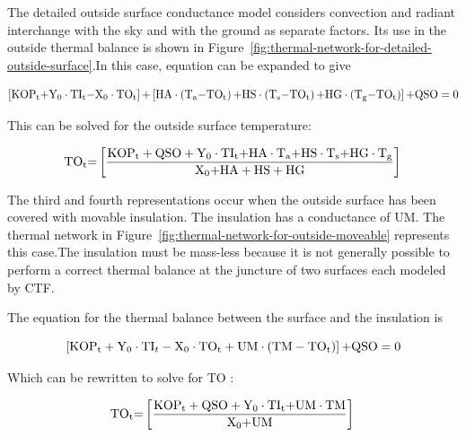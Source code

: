 The detailed outside surface conductance model considers convection and radiant interchange with the sky and with the ground as separate factors. Its use in the outside thermal balance is shown in Figure~\ref{fig:thermal-network-for-detailed-outside-surface}.In this case, equation can be expanded to give

\begin{equation}
\left[ {{\rm{KO}}{{\rm{P}}_{\rm{t}}}{\rm{ + }}{{\rm{Y}}_{\rm{0}}}\cdot {\rm{T}}{{\rm{I}}_{\rm{t}}}{\rm{ - }}{{\rm{X}}_{\rm{0}}}\cdot {\rm{T}}{{\rm{O}}_{\rm{t}}}} \right]{\rm{ + }}\left[ {{\rm{HA}}\cdot \left( {{{\rm{T}}_{\rm{a}}}{\rm{ - T}}{{\rm{O}}_{\rm{t}}}} \right){\rm{ + HS}}\cdot \left( {{{\rm{T}}_{\rm{s}}}{\rm{ - T}}{{\rm{O}}_{\rm{t}}}} \right){\rm{ + HG}}\cdot \left( {{{\rm{T}}_{\rm{g}}}{\rm{ - T}}{{\rm{O}}_{\rm{t}}}} \right)} \right]{\rm{  + QSO  =  0  }}
\end{equation}

This can be solved for the outside surface temperature:

\begin{equation}
{\rm{T}}{{\rm{O}}_{\rm{t}}}{\rm{ = }}\left[ {\frac{{{\rm{KO}}{{\rm{P}}_{\rm{t}}} + {\rm{QSO}} + {{\rm{Y}}_0}\cdot {\rm{T}}{{\rm{I}}_{\rm{t}}}{\rm{ + HA}}\cdot {{\rm{T}}_{\rm{a}}}{\rm{ + HS}}\cdot {{\rm{T}}_{\rm{s}}}{\rm{ + HG}}\cdot {{\rm{T}}_{\rm{g}}}}}{{{{\rm{X}}_{\rm{0}}}{\rm{ + HA + HS + HG}}}}} \right]{\rm{  }}
\end{equation}

The third and fourth representations occur when the outside surface has been covered with movable insulation. The insulation has a conductance of UM. The thermal network in Figure~\ref{fig:thermal-network-for-outside-moveable} represents this case.The insulation must be mass-less because it is not generally possible to perform a correct thermal balance at the juncture of two surfaces each modeled by CTF.

The equation for the thermal balance between the surface and the insulation is

\begin{equation}
\left[ {{\rm{KO}}{{\rm{P}}_{\rm{t}}} + {{\rm{Y}}_{\rm{0}}}\cdot {\rm{T}}{{\rm{I}}_t} - {{\rm{X}}_{\rm{0}}}\cdot {\rm{T}}{{\rm{O}}_{\rm{t}}} + {\rm{UM}}\cdot \left( {{\rm{TM - T}}{{\rm{O}}_{\rm{t}}}} \right)} \right]{\rm{ + QSO  =  0}}
\end{equation}

Which can be rewritten to solve for TO :

\begin{equation}
{\rm{T}}{{\rm{O}}_{\rm{t}}}{\rm{ = }}\left[ {\frac{{{\rm{KO}}{{\rm{P}}_{\rm{t}}} + {\rm{QSO}} + {{\rm{Y}}_0}\cdot {\rm{T}}{{\rm{I}}_{\rm{t}}}{\rm{ + UM}}\cdot {\rm{TM}}}}{{{{\rm{X}}_{\rm{0}}}{\rm{ + UM}}}}} \right]{\rm{  }}
\end{equation}


